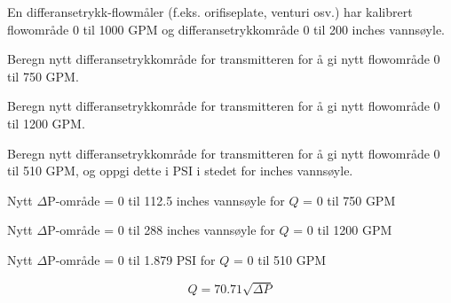 

En differansetrykk-flowmåler (f.eks. orifiseplate, venturi osv.) har kalibrert flowområde 0 til 1000 GPM og differansetrykkområde 0 til 200 inches vannsøyle.

\vskip 10pt

Beregn nytt differansetrykkområde for transmitteren for å gi nytt flowområde 0 til 750 GPM.

\vskip 10pt

Beregn nytt differansetrykkområde for transmitteren for å gi nytt flowområde 0 til 1200 GPM.

\vskip 10pt

Beregn nytt differansetrykkområde for transmitteren for å gi nytt flowområde 0 til 510 GPM, og oppgi dette i PSI i stedet for inches vannsøyle.







Nytt $\Delta$P-område = 0 til 112.5 inches vannsøyle for $Q$ = 0 til 750 GPM

\vskip 10pt

Nytt $\Delta$P-område = 0 til 288 inches vannsøyle for $Q$ = 0 til 1200 GPM

\vskip 10pt

Nytt $\Delta$P-område = 0 til 1.879 PSI for $Q$ = 0 til 510 GPM







$$Q = 70.71 \sqrt{\Delta P}$$


